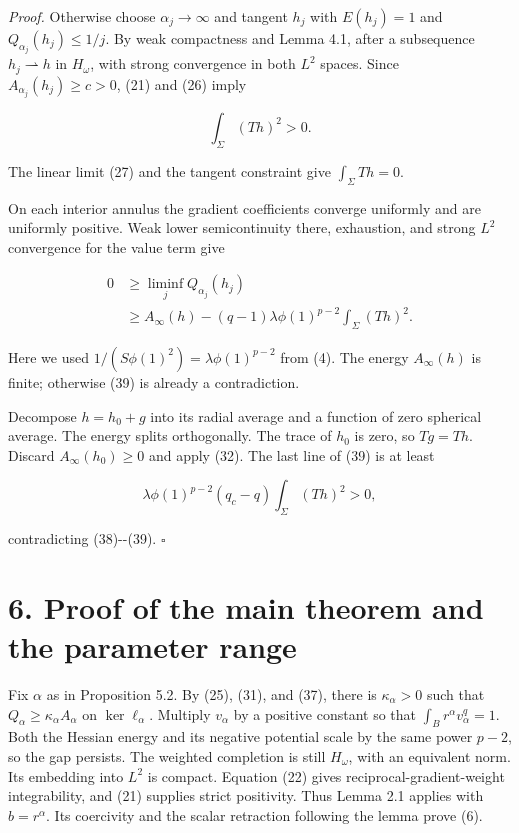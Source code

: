 \documentclass[11pt]{article}
\begin{document}
\emph{Proof.} Otherwise choose \(\alpha_j\to\infty\) and tangent \(h_j\)
with \(E(h_j)=1\) and \(Q_{\alpha_j}(h_j)\le1/j\). By weak compactness
and Lemma 4.1, after a subsequence \(h_j\rightharpoonup h\) in
\(H_\omega\), with strong convergence in both \(L^2\) spaces. Since
\(A_{\alpha_j}(h_j)\ge c>0\), (21) and (26) imply

\[
\int_\Sigma(Th)^2>0.
\tag{38}
\]

The linear limit (27) and the tangent constraint give
\(\int_\Sigma Th=0\).

On each interior annulus the gradient coefficients converge uniformly
and are uniformly positive. Weak lower semicontinuity there, exhaustion,
and strong \(L^2\) convergence for the value term give

\[
\begin{aligned}
0&\ge\liminf_j Q_{\alpha_j}(h_j)\\
 &\ge A_\infty(h)
 -(q-1)\lambda\phi(1)^{p-2}\int_\Sigma(Th)^2.
\end{aligned}
\tag{39}
\]

Here we used \(1/(S\phi(1)^2)=\lambda\phi(1)^{p-2}\) from (4). The
energy \(A_\infty(h)\) is finite; otherwise (39) is already a
contradiction.

Decompose \(h=h_0+g\) into its radial average and a function of zero
spherical average. The energy splits orthogonally. The trace of \(h_0\)
is zero, so \(Tg=Th\). Discard \(A_\infty(h_0)\ge0\) and apply (32). The
last line of (39) is at least

\[
\lambda\phi(1)^{p-2}(q_c-q)\int_\Sigma(Th)^2>0,
\]

contradicting (38)-\/-(39). \(\square\)

\section{6. Proof of the main theorem and the parameter
range}\label{proof-of-the-main-theorem-and-the-parameter-range}

Fix \(\alpha\) as in Proposition 5.2. By (25), (31), and (37), there is
\(\kappa_\alpha>0\) such that \(Q_\alpha\ge\kappa_\alpha A_\alpha\) on
\(\ker\ell_\alpha\). Multiply \(v_\alpha\) by a positive constant so
that \(\int_Br^\alpha v_\alpha^q=1\). Both the Hessian energy and its
negative potential scale by the same power \(p-2\), so the gap persists.
The weighted completion is still \(H_\omega\), with an equivalent norm.
Its embedding into \(L^2\) is compact. Equation (22) gives
reciprocal-gradient-weight integrability, and (21) supplies strict
positivity. Thus Lemma 2.1 applies with \(b=r^\alpha\). Its coercivity
and the scalar retraction following the lemma prove (6).
\end{document}
